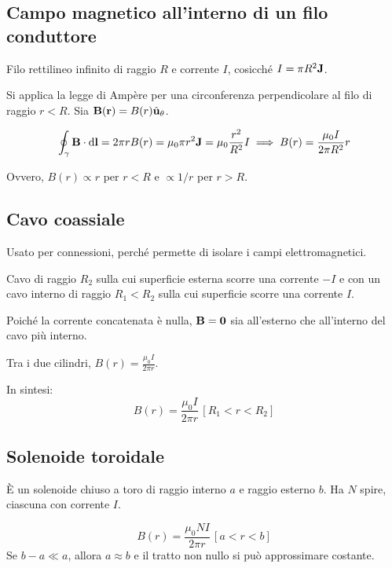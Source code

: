 \subsection{Campo magnetico all'interno di un filo conduttore}

Filo rettilineo infinito di raggio $R$ e corrente $I$, cosicché $I = \pi R^2\mathbf{J}$.

Si applica la legge di Ampère per una circonferenza perpendicolare al filo di raggio $r < R$.
Sia $\mathbf{B}(\mathbf{r}) = B(r) \hat{\mathbf{u}}_{\theta}$.

\begin{equation}
    \oint_\gamma \mathbf{B} \cdot \mathrm{d} \mathbf{l} = 2\pi r B(r)
    = \mu_0 \pi r^2 \mathbf{J}
    = \mu_0 \frac{r^2}{R^2} I
    \implies B(r) = \frac{\mu_0 I}{2\pi R^2} r
\end{equation}

Ovvero, $B(r) \propto r$ per $r < R$ e $\propto 1/r$ per $r > R$.

\subsection{Cavo coassiale}


Usato per connessioni, perché permette di isolare i campi elettromagnetici.

Cavo di raggio $R_2$ sulla cui superficie esterna scorre una corrente $-I$ e con un cavo interno di raggio $R_1 < R_2$ sulla cui superficie scorre una corrente $I$.

Poiché la corrente concatenata è nulla, $\mathbf{B} = \mathbf{0}$ sia all'esterno che all'interno del cavo più interno.

Tra i due cilindri, $B(r) = \frac{\mu_0 I}{2\pi r}$.

In sintesi:
\begin{equation}
    B(r) = \frac{\mu_0 I}{2\pi r} \, [R_1 < r < R_2]
\end{equation}

\subsection{Solenoide toroidale}

È un solenoide chiuso a toro di raggio interno $a$ e raggio esterno $b$.
Ha $N$ spire, ciascuna con corrente $I$.

\begin{equation}
    B(r) = \frac{\mu_0 N I}{2\pi r} \, [a < r < b]
\end{equation}
Se $b - a \ll a$, allora $a \approx b$ e il tratto non nullo si può approssimare costante.

